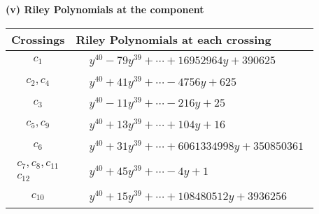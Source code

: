 \documentclass[1p]{elsarticle_modified}
\theoremstyle{definition}
\begin{document}
\newpage\renewcommand{\arraystretch}{1}
\flushleft \textbf{(v) Riley Polynomials at the component}\newline \\
\begin{tabular}{m{50pt}|m{274pt}}
Crossings & \hspace{64pt}Riley Polynomials at each crossing \\
\hline $$\begin{aligned}c_{1}\end{aligned}$$&$\begin{aligned}
&y^{40}-79 y^{39}+\cdots+16952964 y+390625
\end{aligned}$\\
\hline $$\begin{aligned}c_{2},c_{4}\end{aligned}$$&$\begin{aligned}
&y^{40}+41 y^{39}+\cdots-4756 y+625
\end{aligned}$\\
\hline $$\begin{aligned}c_{3}\end{aligned}$$&$\begin{aligned}
&y^{40}-11 y^{39}+\cdots-216 y+25
\end{aligned}$\\
\hline $$\begin{aligned}c_{5},c_{9}\end{aligned}$$&$\begin{aligned}
&y^{40}+13 y^{39}+\cdots+104 y+16
\end{aligned}$\\
\hline $$\begin{aligned}c_{6}\end{aligned}$$&$\begin{aligned}
&y^{40}+31 y^{39}+\cdots+6061334998 y+350850361
\end{aligned}$\\
\hline $$\begin{aligned}c_{7},c_{8},c_{11}\\c_{12}\end{aligned}$$&$\begin{aligned}
&y^{40}+45 y^{39}+\cdots-4 y+1
\end{aligned}$\\
\hline $$\begin{aligned}c_{10}\end{aligned}$$&$\begin{aligned}
&y^{40}+15 y^{39}+\cdots+108480512 y+3936256
\end{aligned}$\\
\hline
\end{tabular}\\~\\
\end{document}
